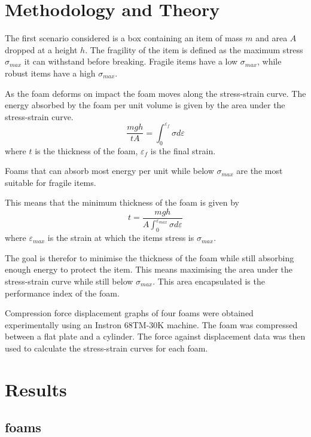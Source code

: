 \documentclass{article}
\begin{document}
\section{Methodology and Theory}

The first scenario considered is a box containing an item of mass $m$ and area $A$ dropped at a height $h$.
The fragility of the item is defined as the maximum stress $\sigma_{max}$ it can withstand before breaking.
Fragile items have a low $\sigma_{max}$, while robust items have a high $\sigma_{max}$.

As the foam deforms on impact the foam moves along the stress-strain curve.
The energy absorbed by the foam per unit volume is given by the area under the stress-strain curve.
\begin{equation}
    \frac{mgh }{t A} = \int_{0}^{\varepsilon_{f}}\sigma d\varepsilon
\end{equation}
where $t$ is the thickness of the foam, $\varepsilon_f$ is the final strain.

Foams that can absorb most energy per unit while below $\sigma_{max}$ are the most suitable for fragile items.

This means that the minimum thickness of the foam is given by
\begin{equation}
    t = \frac{mgh}{A \int_0^{\varepsilon_{max}} \sigma d\varepsilon}
\end{equation}
where $\varepsilon_{max}$ is the strain at which the items stress is $\sigma_{max}$.

The goal is therefor to minimise the thickness of the foam while still absorbing enough energy to protect the item.
This means maximising the area under the stress-strain curve while still below $\sigma_{max}$.
This area encapsulated is the performance index of the foam.

Compression force displacement graphs of four foams were obtained experimentally using an Instron 68TM-30K machine.
The foam was compressed between a flat plate and a cylinder.
The force against displacement data was then used to calculate the stress-strain curves for each foam.



\section{Results}

\subsection{foams}
\end{document}
